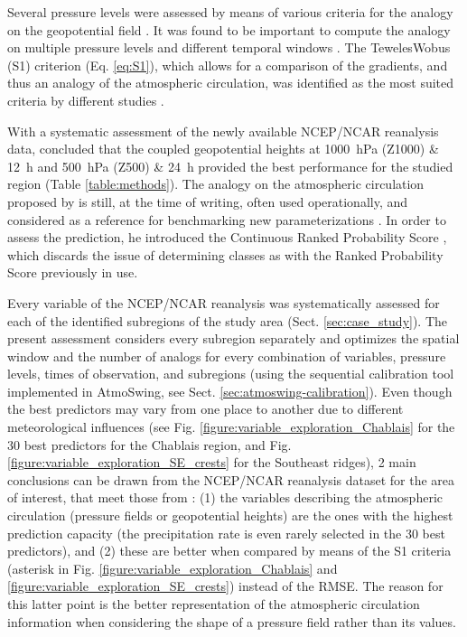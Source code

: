 \documentclass[review]{elsarticle}
\begin{document}
Several pressure levels were assessed by means of various criteria for the analogy on the geopotential field \citep{Duband1970, Duband1974, Duband1981, Guilbaud1997}. It was found to be important to compute the analogy on multiple pressure levels and different temporal windows \citep{Guilbaud1998, Obled2002}. The Teweles\textendash Wobus (S1) criterion (Eq. \ref{eq:S1}), which allows for a comparison of the gradients, and thus an analogy of the atmospheric circulation, was identified as the most suited criteria by different studies \citep{Wilson1980, Woodcock1980, Guilbaud1998, Bontron2004}.

With a systematic assessment of the newly available NCEP/NCAR reanalysis data, \citet{Bontron2004} concluded that the coupled geopotential heights at 1000~hPa (Z1000) \& 12~h and 500~hPa (Z500) \& 24~h provided the best performance for the studied region (Table \ref{table:methods}). The analogy on the atmospheric circulation proposed by \citet{Bontron2004} is still, at the time of writing, often used operationally, and considered as a reference for benchmarking new parameterizations \citep[see e.g.][]{Horton2012, BenDaoud2015}. In order to assess the prediction, he introduced the Continuous Ranked Probability Score \citep[CRPS, Eq. \ref{eq:CRPS}, ][]{Brown1974}, which discards the issue of determining classes as with the Ranked Probability Score \citep{Epstein1969} previously in use.

Every variable of the NCEP/NCAR reanalysis was systematically assessed for each of the identified subregions of the study area (Sect. \ref{sec:case_study}). The present assessment considers every subregion separately and optimizes the spatial window and the number of analogs for every combination of variables, pressure levels, times of observation, and subregions (using the sequential calibration tool implemented in AtmoSwing, see Sect. \ref{sec:atmoswing-calibration}). Even though the best predictors may vary from one place to another due to different meteorological influences (see Fig. \ref{figure:variable_exploration_Chablais} for the 30 best predictors for the Chablais region, and Fig. \ref{figure:variable_exploration_SE_crests} for the Southeast ridges), 2 main conclusions can be drawn from the NCEP/NCAR reanalysis dataset for the area of interest, that meet those from \citet{Bontron2004}: (1) the variables describing the atmospheric circulation (pressure fields or geopotential heights) are the ones with the highest prediction capacity (the precipitation rate is even rarely selected in the 30 best predictors), and (2) these are better when compared by means of the S1 criteria (asterisk in Fig. \ref{figure:variable_exploration_Chablais} and \ref{figure:variable_exploration_SE_crests}) instead of the RMSE. The reason for this latter point is the better representation of the atmospheric circulation information when considering the shape of a pressure field rather than its values.
\end{document}

